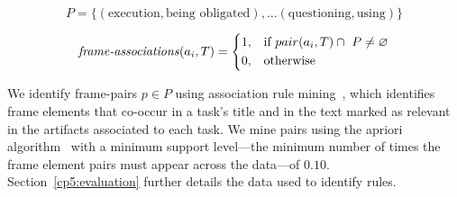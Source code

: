 \begin{small}
\begin{equation}
P = \{ (\text{execution}, \text{being obligated}), \dots (\text{questioning}, \text{using}) \} 
\end{equation}

\begin{equation}
\text{\textit{frame-associations}}(a_i, T) = \left \{
\begin{aligned}
    &1, && \text{if}\ pair(a_i, T) \cap ~P \ne \emptyset \\
    &0, && \text{otherwise}
\end{aligned} \right.
\end{equation} 
\end{small}



We identify frame-pairs $p \in P$ using association rule mining~\cite{agrawal1994apriori}, which identifies 
frame elements that co-occur in a task's title and in the text marked as relevant in the artifacts associated to each task.
We mine pairs using the apriori algorithm~\cite{apriori-python} with a minimum support level---the minimum number of times the frame element
pairs must appear across the data---of $0.10$. Section~\ref{cp5:evaluation} further details the data used to identify rules.









